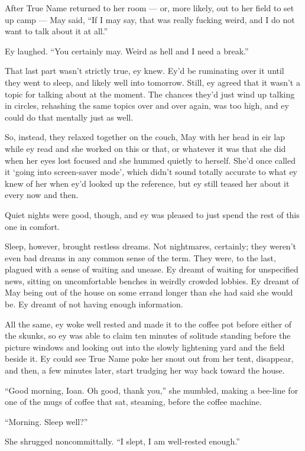 After True Name returned to her room — or, more likely, out to her field to set up camp — May said, ``If I may say, that was really fucking weird, and I do not want to talk about it at all.''

Ey laughed. ``You certainly may. Weird as hell and I need a break.''

That last part wasn't strictly true, ey knew. Ey'd be ruminating over it until they went to sleep, and likely well into tomorrow. Still, ey agreed that it wasn't a topic for talking about at the moment. The chances they'd just wind up talking in circles, rehashing the same topics over and over again, was too high, and ey could do that mentally just as well.

So, instead, they relaxed together on the couch, May with her head in eir lap while ey read and she worked on this or that, or whatever it was that she did when her eyes lost focused and she hummed quietly to herself. She'd once called it `going into screen-saver mode', which didn't sound totally accurate to what ey knew of her when ey'd looked up the reference, but ey still teased her about it every now and then.

Quiet nights were good, though, and ey was pleased to just spend the rest of this one in comfort.

Sleep, however, brought restless dreams. Not nightmares, certainly; they weren't even bad dreams in any common sense of the term. They were, to the last, plagued with a sense of waiting and unease. Ey dreamt of waiting for unspecified news, sitting on uncomfortable benches in weirdly crowded lobbies. Ey dreamt of May being out of the house on some errand longer than she had said she would be. Ey dreamt of not having enough information.

All the same, ey woke well rested and made it to the coffee pot before either of the skunks, so ey was able to claim ten minutes of solitude standing before the picture windows and looking out into the slowly lightening yard and the field beside it. Ey could see True Name poke her snout out from her tent, disappear, and then, a few minutes later, start trudging her way back toward the house.

``Good morning, Ioan. Oh good, thank you,'' she mumbled, making a bee-line for one of the mugs of coffee that sat, steaming, before the coffee machine.

``Morning. Sleep well?''

She shrugged noncommittally. ``I slept, I am well-rested enough.''

